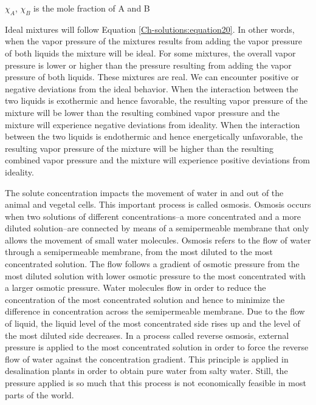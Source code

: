 \documentclass[main.tex]{subfiles}
\newcommand\chapterlabel{Ch-solutions}\setcounter{figurenewcounter}{0}\setcounter{tablenewcounter}{0}\setcounter{formulanewcounter}{0}
\begin{document}
\begin{description}
\begin{where}
  \item $\chi_A$,  $\chi_B$  is the mole fraction of A and B
\end{where}
Ideal mixtures will follow Equation \ref{\chapterlabel:equation20}. In other words, when the vapor pressure of the mixtures results from adding the vapor pressure of both liquids the mixture will be ideal. For some mixtures, the overall vapor pressure is lower or higher than the pressure resulting from adding the vapor pressure of both liquids. These mixtures are real. We can encounter positive or negative deviations from the ideal behavior. When the interaction between the two liquids is exothermic and hence favorable, the resulting vapor pressure of the mixture will be lower than the resulting combined vapor pressure and the mixture will experience negative deviations from ideality. When the interaction between the two liquids is endothermic and hence energetically unfavorable, the resulting vapor pressure of the mixture will be higher than the resulting combined vapor pressure and the mixture will experience positive deviations from ideality.

\item[\docfilehook{Osmosis}{}] 
The solute concentration impacts the movement of water in and out of the animal and vegetal cells. This important process is called osmosis. Osmosis occurs when two solutions of different concentrations--a more concentrated and a more diluted solution--are connected by means of a semipermeable membrane that only allows the movement of small water molecules. Osmosis refers to the flow of water through a semipermeable membrane, from the most diluted to the most concentrated solution. The flow follows a gradient of osmotic pressure from the most diluted solution with lower osmotic pressure to the most concentrated with a larger osmotic pressure. Water molecules flow in order to reduce the concentration of the most concentrated solution and hence to minimize the difference in concentration across the semipermeable membrane. Due to the flow of liquid, the liquid level of the most concentrated side rises up and the level of the most diluted side decreases.
In a process called reverse osmosis, external pressure is applied to the most concentrated solution in order to force the reverse flow of water against the concentration gradient. This principle is applied in desalination plants in order to obtain pure water from salty water. Still, the pressure applied is so much that this process is not economically feasible in most parts of the world.



\end{description}
\end{document}
